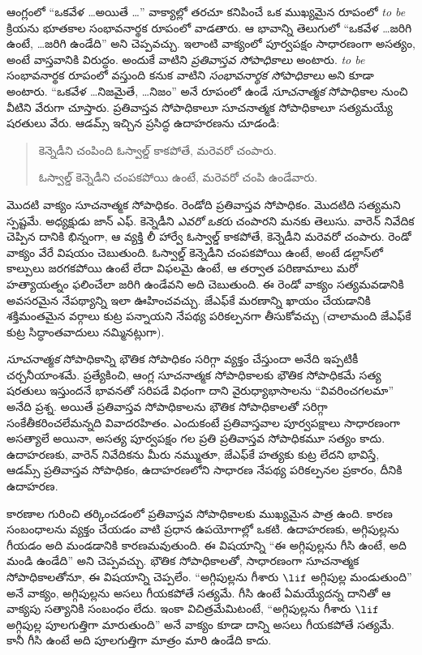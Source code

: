 \documentclass[../../../include/open-logic-section]{subfiles}
\begin{document}


ఆంగ్లంలో ``ఒకవేళ \dots అయితే \dots'' వాక్యాల్లో తరచూ
కనిపించే ఒక ముఖ్యమైన రూపంలో \emph{to be} క్రియను
భూతకాల సంభావనార్థక రూపంలో వాడతారు. ఆ భావాన్ని తెలుగులో
``ఒకవేళ \dots జరిగి ఉంటే, \dots జరిగి ఉండేది'' అని చెప్పవచ్చు.
ఇలాంటి వాక్యంలో పూర్వపక్షం సాధారణంగా అసత్యం, అంటే
వాస్తవానికి విరుద్ధం. అందుకే వాటిని \emph{ప్రతివాస్తవ సోపాధికాలు}
అంటారు. \emph{to be} సంభావనార్థక రూపంలో వస్తుంది కనుక వాటిని
\emph{సంభావనార్థక సోపాధికాలు} అని కూడా అంటారు.
``ఒకవేళ \dots నిజమైతే, \dots నిజం'' అనే రూపంలో ఉండే
\emph{సూచనాత్మక} సోపాధికాల నుంచి వీటిని వేరుగా చూస్తారు.
ప్రతివాస్తవ సోపాధికాలూ సూచనాత్మక సోపాధికాలూ సత్యమయ్యే
షరతులు వేరు. ఆడమ్స్ ఇచ్చిన ప్రసిద్ధ ఉదాహరణను చూడండి:
\begin{quote}
  కెన్నెడీని చంపింది ఓస్వాల్డ్ కాకపోతే, మరెవరో చంపారు.

  ఓస్వాల్డ్ కెన్నెడీని చంపకపోయి ఉంటే, మరెవరో చంపి ఉండేవారు.
\end{quote}
మొదటి వాక్యం సూచనాత్మక సోపాధికం. రెండోది ప్రతివాస్తవ
సోపాధికం. మొదటిది సత్యమని స్పష్టమే. అధ్యక్షుడు జాన్ ఎఫ్. కెన్నెడీని \emph{ఎవరో ఒకరు}
చంపారని మనకు తెలుసు. వారెన్ నివేదిక చెప్పిన దానికి భిన్నంగా,
ఆ వ్యక్తి లీ హార్వే ఓస్వాల్డ్ కాకపోతే, కెన్నెడీని మరెవరో చంపారు.
రెండో వాక్యం వేరే విషయం చెబుతుంది. ఓస్వాల్డ్ కెన్నెడీని
చంపకపోయి ఉంటే, అంటే డల్లాస్‌లో కాల్పులు జరగకపోయి ఉంటే
లేదా విఫలమై ఉంటే, ఆ తర్వాత పరిణామాలు మరో
హత్యాయత్నం ఫలించేలా జరిగి ఉండేవని అది చెబుతుంది. ఈ రెండో వాక్యం
సత్యమవడానికి అవసరమైన నేపథ్యాన్ని ఇలా ఊహించవచ్చు.
జేఎఫ్‌కే మరణాన్ని ఖాయం చేయడానికి
శక్తిమంతమైన వర్గాలు కుట్ర పన్నాయని
నేపథ్య పరికల్పనగా తీసుకోవచ్చు
(చాలామంది జేఎఫ్‌కే కుట్ర
సిద్ధాంతవాదులు నమ్మినట్లుగా).

\emph{సూచనాత్మక} సోపాధికాన్ని భౌతిక
సోపాధికం సరిగ్గా వ్యక్తం చేస్తుందా అనేది
ఇప్పటికీ చర్చనీయాంశమే. ప్రత్యేకించి,
ఆంగ్ల సూచనాత్మక సోపాధికాలకు భౌతిక
సోపాధికమే సత్య షరతులు ఇస్తుందనే
భావనతో సరిపడే విధంగా దాని
వైరుధ్యాభాసాలను ``వివరించగలమా''
అనేది ప్రశ్న. అయితే ప్రతివాస్తవ
సోపాధికాలను భౌతిక సోపాధికాలతో
సరిగ్గా సంకేతీకరించలేమన్నది
వివాదరహితం. ఎందుకంటే ప్రతివాస్తవాల
పూర్వపక్షాలు సాధారణంగా అసత్యాలే
అయినా, అసత్య పూర్వపక్షం గల ప్రతి
ప్రతివాస్తవ సోపాధికమూ సత్యం కాదు.
ఉదాహరణకు, వారెన్ నివేదికను మీరు
నమ్ముతూ, జేఎఫ్‌కే హత్యకు కుట్ర
లేదని భావిస్తే, ఆడమ్స్ ప్రతివాస్తవ
సోపాధికం, ఉదాహరణలోని సాధారణ నేపథ్య
పరికల్పనల ప్రకారం, దీనికి ఉదాహరణ.

కారణాల గురించి తర్కించడంలో ప్రతివాస్తవ సోపాధికాలకు ముఖ్యమైన
పాత్ర ఉంది. కారణ సంబంధాలను వ్యక్తం చేయడం వాటి ప్రధాన ఉపయోగాల్లో
ఒకటి. ఉదాహరణకు, అగ్గిపుల్లను గీయడం అది మండడానికి కారణమవుతుంది.
ఈ విషయాన్ని ``ఈ అగ్గిపుల్లను గీసి ఉంటే, అది మండి ఉండేది''
అని చెప్పవచ్చు. భౌతిక సోపాధికాలతో, సాధారణంగా సూచనాత్మక
సోపాధికాలతోనూ, ఈ విషయాన్ని చెప్పలేం. ``అగ్గిపుల్లను గీశారు
$\lif$ అగ్గిపుల్ల మండుతుంది'' అనే వాక్యం, అగ్గిపుల్లను అసలు
గీయకపోతే సత్యమే. గీసి ఉంటే ఏమయ్యేదన్న దానితో ఆ వాక్యపు
సత్యానికి సంబంధం లేదు. ఇంకా విచిత్రమేమిటంటే, ``అగ్గిపుల్లను
గీశారు $\lif$ అగ్గిపుల్ల పూలగుత్తిగా మారుతుంది'' అనే వాక్యం
కూడా దాన్ని అసలు గీయకపోతే సత్యమే. కానీ గీసి ఉంటే అది
పూలగుత్తిగా మాత్రం మారి ఉండేది కాదు.
\end{document}
